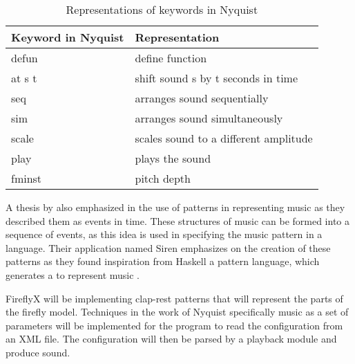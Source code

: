 \begin{table}[H]
\centering
\label{NyquistKeywords}
\caption{Representations of keywords in Nyquist}
\begin{tabular}{|l|l|} 
\hline
\textbf{Keyword in Nyquist}  & \textbf{Representation}                \\ 
\hline
defun                        & define function                        \\ 
\hline
at s t                       & shift sound s by t seconds in time     \\ 
\hline
seq                          & arranges sound sequentially            \\ 
\hline
sim                          & arranges sound simultaneously          \\ 
\hline
scale                        & scales sound to a different amplitude  \\ 
\hline
play                         & plays the sound                        \\ 
\hline
fminst                       & pitch depth                            \\
\hline
\end{tabular}
\end{table}

A thesis by  also emphasized in the use of patterns in representing music as they described them as events in time. These structures of music can be formed into a sequence of events, as this idea is used in specifying the music pattern in a language. Their application named Siren emphasizes on the creation of these patterns as they found inspiration from Haskell a pattern language, which generates a  to represent music \cite{ince2019programming}.

FireflyX will be implementing clap-rest patterns that will represent the parts of the firefly model. Techniques in the work of Nyquist specifically music as a set of parameters will be implemented for the program to read the configuration from an XML file. The configuration will then be parsed by a playback module and produce sound.




